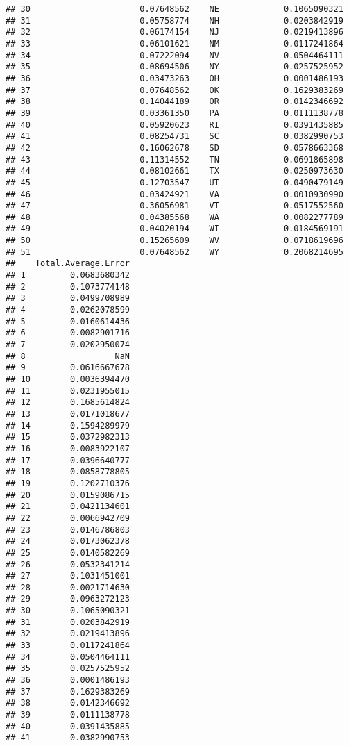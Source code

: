 \documentclass{article}\usepackage[]{graphicx}\usepackage[]{color}
\makeatletter
\newenvironment{kframe}{%
 \def\at@end@of@kframe{}%
 \ifinner\ifhmode%
  \def\at@end@of@kframe{\end{minipage}}%
  \begin{minipage}{\columnwidth}%
 \fi\fi%
 \def\FrameCommand##1{\hskip\@totalleftmargin \hskip-\fboxsep
 \colorbox{shadecolor}{##1}\hskip-\fboxsep
     \hskip-\linewidth \hskip-\@totalleftmargin \hskip\columnwidth}%
 \MakeFramed {\advance\hsize-\width
   \@totalleftmargin\z@ \linewidth\hsize
   \@setminipage}}%
 {\par\unskip\endMakeFramed%
 \at@end@of@kframe}
\newenvironment{knitrout}{}{} %
\makeatother
\begin{document}
\begin{knitrout}
\begin{kframe}
\begin{verbatim}
## 30                      0.07648562    NE             0.1065090321
## 31                      0.05758774    NH             0.0203842919
## 32                      0.06174154    NJ             0.0219413896
## 33                      0.06101621    NM             0.0117241864
## 34                      0.07222094    NV             0.0504464111
## 35                      0.08694506    NY             0.0257525952
## 36                      0.03473263    OH             0.0001486193
## 37                      0.07648562    OK             0.1629383269
## 38                      0.14044189    OR             0.0142346692
## 39                      0.03361350    PA             0.0111138778
## 40                      0.05920623    RI             0.0391435885
## 41                      0.08254731    SC             0.0382990753
## 42                      0.16062678    SD             0.0578663368
## 43                      0.11314552    TN             0.0691865898
## 44                      0.08102661    TX             0.0250973630
## 45                      0.12703547    UT             0.0490479149
## 46                      0.03424921    VA             0.0010930990
## 47                      0.36056981    VT             0.0517552560
## 48                      0.04385568    WA             0.0082277789
## 49                      0.04020194    WI             0.0184569191
## 50                      0.15265609    WV             0.0718619696
## 51                      0.07648562    WY             0.2068214695
##    Total.Average.Error
## 1         0.0683680342
## 2         0.1073774148
## 3         0.0499708989
## 4         0.0262078599
## 5         0.0160614436
## 6         0.0082901716
## 7         0.0202950074
## 8                  NaN
## 9         0.0616667678
## 10        0.0036394470
## 11        0.0231955015
## 12        0.1685614824
## 13        0.0171018677
## 14        0.1594289979
## 15        0.0372982313
## 16        0.0083922107
## 17        0.0396640777
## 18        0.0858778805
## 19        0.1202710376
## 20        0.0159086715
## 21        0.0421134601
## 22        0.0066942709
## 23        0.0146786803
## 24        0.0173062378
## 25        0.0140582269
## 26        0.0532341214
## 27        0.1031451001
## 28        0.0021714630
## 29        0.0963272123
## 30        0.1065090321
## 31        0.0203842919
## 32        0.0219413896
## 33        0.0117241864
## 34        0.0504464111
## 35        0.0257525952
## 36        0.0001486193
## 37        0.1629383269
## 38        0.0142346692
## 39        0.0111138778
## 40        0.0391435885
## 41        0.0382990753

\end{verbatim}
\end{kframe}
\end{knitrout}
\end{document}
